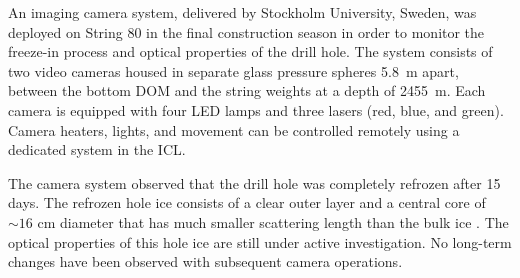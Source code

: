 An imaging camera system, delivered by Stockholm University, Sweden, was deployed on String 80 in the final
construction season in order to monitor the freeze-in process and optical
properties of the drill hole.  The system consists of two video cameras
housed in separate glass pressure spheres \SI{5.8}{m} apart, between the
bottom DOM and the string weights at a depth of \SI{2455}{m}.  Each
camera is equipped with four LED lamps and three lasers (red, blue, and
green).  Camera heaters, lights, and movement can be controlled remotely
using a dedicated system in the ICL.  

The camera system observed that the drill hole was completely refrozen after
15 days.  The refrozen hole ice consists of a clear outer
layer and a central core of $\sim16$ cm diameter that has much
smaller scattering length than the bulk ice \cite{rongen_vlvnt15}.  The
optical properties of this hole ice are still under active investigation.
No long-term changes have been observed with subsequent camera operations.
